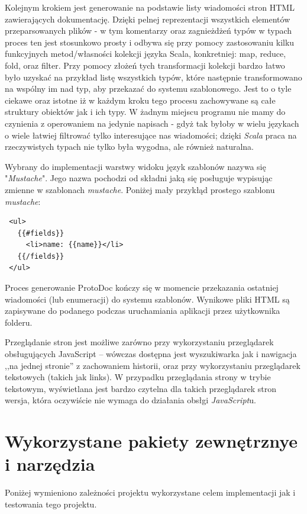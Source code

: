 \documentclass[a4paper]{article}
\begin{document}
Kolejnym krokiem jest generowanie na podstawie listy wiadomości stron HTML zawierających dokumentację. Dzięki pelnej reprezentacji wszystkich elementów 
przeparsowanych plików - w tym komentarzy oraz zagnieżdżeń typów w typach proces ten jest stosunkowo prosty i odbywa się przy pomocy zastosowaniu
kilku funkcyjnych metod/własności kolekcji języka Scala, konkretniej: map, reduce, fold, oraz filter. Przy pomocy złożeń tych transformacji kolekcji bardzo łatwo było
uzyskać na przykład listę wszystkich typów, które następnie transformowano na wspólny im nad typ, aby przekazać do systemu szablonowego.  
Jest to o tyle ciekawe oraz istotne iż w każdym kroku tego procesu zachowywane są całe struktury obiektów jak i ich typy. W żadnym miejscu programu nie mamy 
do czynienia z operowaniem na jedynie napisach - gdyż tak byłoby w wielu językach o wiele łatwiej filtrować tylko interesujące nas wiadomości; dzięki \textit{Scala}
praca na rzeczywistych typach nie tylko była wygodna, ale również naturalna.

\newpage
Wybrany do implementacji warstwy widoku język szablonów nazywa się "\textit{Mustache}". Jego nazwa pochodzi od składni jaką się posługuje wypisując zmienne w szablonach
\textit{mustache}. Poniżej mały przykłąd prostego szablonu \textit{mustache}:
\begin{verbatim}
 <ul>
   {{#fields}}
     <li>name: {{name}}</li>
   {{/fields}}
 </ul>
\end{verbatim}
Proces generowanie ProtoDoc kończy się w momencie przekazania ostatniej wiadomości (lub enumeracji) do systemu szablonów. 
Wynikowe pliki HTML są zapisywane do podanego podczas uruchamiania aplikacji przez użytkownika folderu. 

Przeglądanie stron jest możliwe zarówno przy wykorzystaniu przeglądarek obsługujących JavaScript -- wówczas dostępna jest wyszukiwarka jak i nawigacja 
,,na jednej stronie'' z zachowaniem historii, oraz przy wykorzystaniu przeglądarek tekstowych (takich jak links). W przypadku przeglądania strony w trybie tekstowym,
wyświetlana jest bardzo czytelna dla takich przeglądarek stron wersja, która oczywiście nie wymaga do działania obsłgi \textit{JavaScript}u. 


\section{Wykorzystane pakiety zewnętrznye i narzędzia}
Poniżej wymieniono zależności projektu wykorzystane celem implementacji jak i testowania tego projektu.
\end{document}
